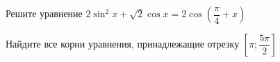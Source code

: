 \begin{ex}
	\begin{condition}
		\begin{enumcols}[label=\asbuk*)]
			\item Решите уравнение \( 2\sin^2 x + \sqrt{2}\cos x = 2\cos{\left( \dfrac{\pi}{4}+x\right)} \)
			\item Найдите все корни уравнения, принадлежащие отрезку \(  \left[\pi;\dfrac{5\pi}{2}\right] \)
		\end{enumcols}
	\end{condition}
\end{ex}